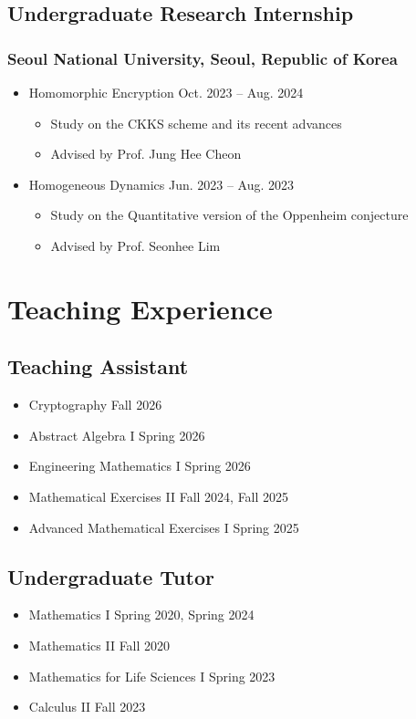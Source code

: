 \documentclass[11pt]{article}
\begin{document}
\subsection{Undergraduate Research Internship}
\subsubsection{Seoul National University, Seoul, Republic of Korea}
\begin{itemize}
    \item Homomorphic Encryption \hfill Oct. 2023 -- Aug. 2024
    \begin{itemize}
        \item Study on the CKKS scheme and its recent advances
        \item Advised by Prof. Jung Hee Cheon
    \end{itemize}

    \item Homogeneous Dynamics \hfill Jun. 2023 -- Aug. 2023
    \begin{itemize}
        \item Study on the Quantitative version of the Oppenheim conjecture
        \item Advised by Prof. Seonhee Lim
    \end{itemize}
\end{itemize}

\section{Teaching Experience}

\subsection{Teaching Assistant}
\begin{itemize}
    \item Cryptography \hfill Fall 2026
    \item Abstract Algebra I \hfill Spring 2026
    \item Engineering Mathematics I \hfill Spring 2026
    \item Mathematical Exercises II \hfill Fall 2024, Fall 2025
    \item Advanced Mathematical Exercises I \hfill Spring 2025
\end{itemize}

\subsection{Undergraduate Tutor}
\begin{itemize}
    \item Mathematics I \hfill Spring 2020, Spring 2024
    \item Mathematics II \hfill Fall 2020
    \item Mathematics for Life Sciences I \hfill Spring 2023
    \item Calculus II \hfill Fall 2023
\end{itemize}
\end{document}
